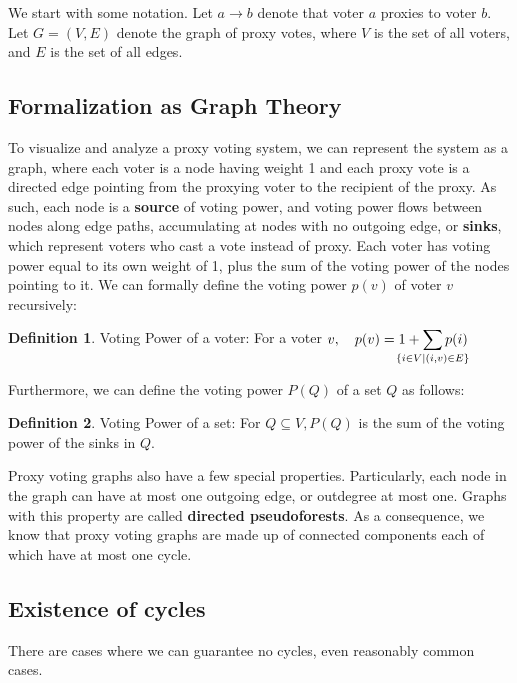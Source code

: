 \documentclass[10pt]{article}
\theoremstyle{definition}
\newtheorem{definition}{Definition}[section]
\begin{document}
We start with some notation. Let $a \rightarrow b$ denote that voter $a$ proxies to voter $b$.  Let $G = (V,E)$ denote the graph of proxy votes, where $V$ is the set of all voters, and $E$ is the set of all edges.

\subsection{Formalization as Graph Theory}
To visualize and analyze a proxy voting system, we can represent the system as a graph, where each voter is a node having weight 1 and each proxy vote is a directed edge pointing from the proxying voter to the recipient of the proxy. As such, each node is a \textbf{source} of voting power, and voting power flows between nodes along edge paths, accumulating at nodes with no outgoing edge, or \textbf{sinks}, which represent voters who cast a vote instead of proxy. Each voter has voting power equal to its own weight of 1, plus the sum of the voting power of the nodes pointing to it. We can formally define the voting power $p(v)$ of voter $v$ recursively:

\theoremstyle{definition}
\begin{definition}{Voting Power of a voter:}
For a voter $v, \quad p(v) = 1 + \smashoperator{\sum\limits_{\{i \in V \mid (i,v) \in E\}}}p(i)$
\end{definition}

Furthermore, we can define the voting power $P(Q)$ of a set $Q$ as follows:

\theoremstyle{definition}
\begin{definition}{Voting Power of a set:}
For $Q \subseteq V, P(Q)$ is the sum of the voting power of the sinks in $Q$.
\end{definition}



Proxy voting graphs also have a few special properties. Particularly, each node in the graph can have at most one outgoing edge, or outdegree at most one. Graphs with this property are called \textbf{directed pseudoforests}. As a consequence, we know that proxy voting graphs are made up of connected components each of which have at most one cycle.




\subsection{Existence of cycles}

There are cases where we can guarantee no cycles, even reasonably common cases.
\end{document}
